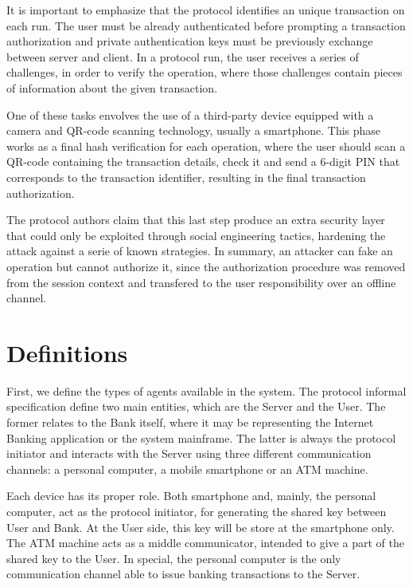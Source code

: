 It is important to emphasize that the protocol identifies an unique transaction on each run. The user must be already authenticated before prompting a transaction authorization and private authentication keys must be previously exchange between server and client. In a protocol run, the user receives a series of challenges, in order to verify the operation, where those challenges contain pieces of information about the given transaction.

One of these tasks envolves the use of a third-party device equipped with a camera and QR-code scanning technology, usually a smartphone. This phase works as a final hash verification for each operation, where the user should scan a QR-code containing the transaction details, check it and send a 6-digit PIN that corresponds to the transaction identifier, resulting in the final transaction authorization.

The protocol authors claim that this last step produce an extra security layer that could only be exploited through social engineering tactics, hardening the attack against a serie of known strategies. In summary, an attacker can fake an operation but cannot authorize it, since the authorization procedure was removed from the session context and transfered to the user responsibility over an offline channel.





\section{Definitions}
First, we define the types of agents available in the system. The protocol informal specification define two main entities, which are the Server and the User. The former relates to the Bank itself, where it may be representing the Internet Banking application or the system mainframe. The latter is always the protocol initiator and interacts with the Server using three different communication channels: a personal computer, a mobile smartphone or an ATM machine.

Each device has its proper role. Both smartphone and, mainly, the personal computer, act as the protocol initiator, for generating the shared key between User and Bank. At the User side, this key will be store at the smartphone only. The ATM machine acts as a middle communicator, intended to give a part of the shared key to the User. In special, the personal computer is the only communication channel able to issue banking transactions to the Server.

